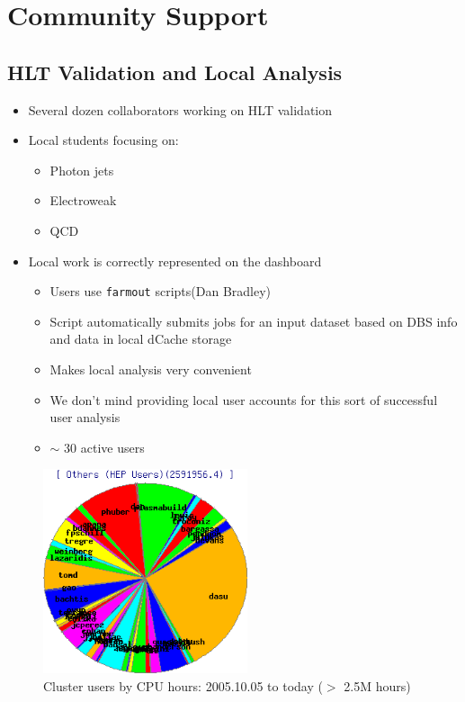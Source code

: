 \documentclass{beamer}
\newcommand{\ca}{\ensuremath{\sim}}
\begin{document}
\section{Community Support}
\subsection{HLT Validation and Local Analysis}
\begin{frame}
\begin{itemize}
    \item Several dozen collaborators working on HLT validation
    \item Local students focusing on:
    \begin{itemize}
        \item Photon jets
        \item Electroweak
        \item QCD
    \end{itemize}
    \item Local work is correctly represented on the dashboard
    \begin{itemize}
        \item Users use {\tt farmout} scripts\footnotemark[1] (Dan Bradley)
        \item Script automatically submits jobs for an input dataset based on DBS info and data in local dCache storage
        \item Makes local analysis very convenient
        \item We don't mind providing local user accounts for this sort of successful user analysis
        \item \ca{} 30 active users
    \end{itemize}
\end{itemize}
\end{frame}

\begin{frame}
\begin{figure}
    \includegraphics[height=6cm]{Graphics/glow-userpie.png}
    \caption{Cluster users by CPU hours: 2005.10.05 to today ($>$ 2.5M hours)}
\end{figure}
\end{frame}
\end{document}
